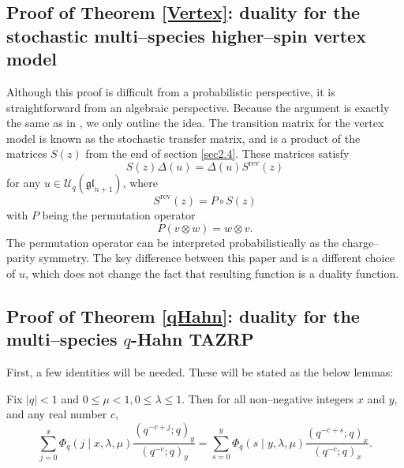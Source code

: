 \documentclass{ximera}
\begin{document}
\subsection{Proof of Theorem \ref{Vertex}: duality for the stochastic multi--species higher--spin vertex model}
Although this proof is difficult from a probabilistic perspective, it is straightforward from an algebraic perspective. Because the argument is exactly the same as in \cite{KuanCMP}, we only outline the idea. The transition matrix for the vertex model is known as the stochastic transfer matrix,  and is a product of the matrices $S(z)$ from the end of section \ref{sec2.4}. These matrices satisfy
$$
S(z) \Delta(u) = \Delta(u) S^{\text{rev}}(z)
$$
for any $u\in \mathcal{U}_q(\mathfrak{gl}_{n+1})$, where
$$
S^{\text{rev}}(z) = P \circ S(z)
$$
with $P$ being the permutation operator
$$
P(v \otimes w) = w\otimes v.
$$
The permutation operator can be interpreted probabilistically as the charge--parity symmetry. The key difference between this paper and \cite{KuanCMP} is a different choice of $u$, which does not change the fact that resulting function is a duality function.


\subsection{Proof of Theorem \ref{qHahn}: duality for the multi--species   $q$-Hahn TAZRP}

First, a few identities will be needed. These will be stated as the below lemmas:

\begin{lemma}\label{lemma:1}
Fix $\vert q\vert<1$ and $0\leq \mu<1, 0 \leq \lambda \leq 1$. Then for all non--negative integers $x$ and $y$, and any real number $c$,
$$
\sum_{j=0}^{x} \Phi_{q}(j \mid x, \lambda, \mu) \frac{\left(q^{-c+j};q\right)_{y}}{\left(q^{-c};q\right)_{y}}=\sum_{s=0}^{y} \Phi_{q}(s \mid y, \lambda, \mu) \frac{\left(q^{-c+s};q\right)_{x}}{\left(q^{-c};q\right)_{x}}.
$$

\end{lemma}
\end{document}
